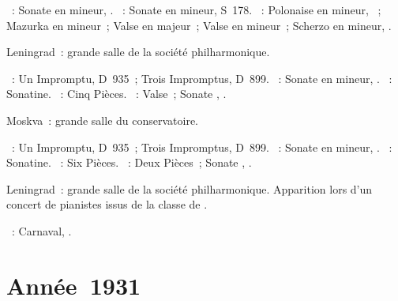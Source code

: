 \begin{description}
 \textsc{\Schumann{}}~: Sonate en \kF \Sharp mineur, .
 \textsc{\Liszt{}}~: Sonate en \kB mineur, S~178.
 \textsc{\Chopin{}}~: Polonaise en \kF \Sharp mineur, ~; Mazurka en
 \kC \Sharp mineur~; Valse en \kD \Flat majeur~; Valse  en \kA
 mineur~; Scherzo  en \kB mineur, .
 \item[\DateWithWeekDay{1930-12-08}]
 Leningrad~: grande salle de la société philharmonique.

 \textsc{\Schubert{}}~: Un Impromptu, D~935~; Trois Impromptus, D~899.
 \textsc{\Beethoven{}}~: Sonate  en \kF mineur, .
 \textsc{\Ravel{}}~: Sonatine.
 \textsc{\Prokofiev{}}~: Cinq Pièces.
 \textsc{\Scriabine{}}~: Valse~; Sonate , .
 \item[\DateWithWeekDay{1930-12-14}]
 Moskva~: grande salle du conservatoire.

 \textsc{\Schubert{}}~: Un Impromptu, D~935~; Trois Impromptus, D~899.
 \textsc{\Beethoven{}}~: Sonate  en \kF mineur, .
 \textsc{\Ravel{}}~: Sonatine.
 \textsc{\Prokofiev{}}~: Six Pièces.
 \textsc{\Scriabine{}}~: Deux Pièces~; Sonate , .
 \item[\DateWithWeekDay{1930-12-28}]
 Leningrad~: grande salle de la société philharmonique.
 Apparition lors d'un concert de pianistes issus de la classe de
 \LNikolaiev{}.

 \textsc{\Schumann{}}~: Carnaval, .
\end{description}

\section{Année~1931}

